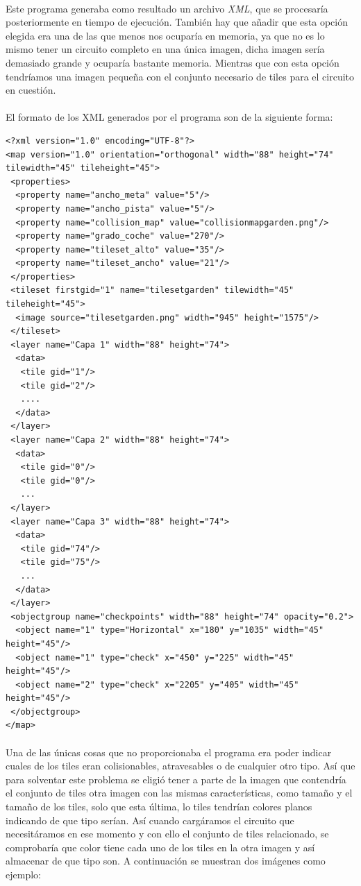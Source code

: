 \paragraph{}
Este programa generaba como resultado un archivo \emph{XML}, que se procesaría posteriormente en tiempo de ejecución. También hay
que añadir que esta opción elegida era una de las que menos nos ocuparía en memoria, ya que no es lo mismo tener un circuito 
completo en una única imagen, dicha imagen sería demasiado grande y ocuparía bastante memoria. Mientras
que con esta opción tendríamos una imagen pequeña con el conjunto necesario de tiles para el circuito en cuestión.

\paragraph{}
El formato de los XML generados por el programa son de la siguiente forma:

\begin{lstlisting}[style=XML]
<?xml version="1.0" encoding="UTF-8"?>
<map version="1.0" orientation="orthogonal" width="88" height="74" tilewidth="45" tileheight="45">
 <properties>
  <property name="ancho_meta" value="5"/>
  <property name="ancho_pista" value="5"/>
  <property name="collision_map" value="collisionmapgarden.png"/>
  <property name="grado_coche" value="270"/>
  <property name="tileset_alto" value="35"/>
  <property name="tileset_ancho" value="21"/>
 </properties>
 <tileset firstgid="1" name="tilesetgarden" tilewidth="45" tileheight="45">
  <image source="tilesetgarden.png" width="945" height="1575"/>
 </tileset>
 <layer name="Capa 1" width="88" height="74">
  <data>   
   <tile gid="1"/>
   <tile gid="2"/>
   ....
  </data>   
 </layer>
 <layer name="Capa 2" width="88" height="74">
  <data>
   <tile gid="0"/>
   <tile gid="0"/>
   ...
 </layer>
 <layer name="Capa 3" width="88" height="74">
  <data>
   <tile gid="74"/>
   <tile gid="75"/>
   ...
  </data>
 </layer>
 <objectgroup name="checkpoints" width="88" height="74" opacity="0.2">
  <object name="1" type="Horizontal" x="180" y="1035" width="45" height="45"/>
  <object name="1" type="check" x="450" y="225" width="45" height="45"/>
  <object name="2" type="check" x="2205" y="405" width="45" height="45"/>
 </objectgroup>
</map>
\end{lstlisting}

\paragraph{}
Una de las únicas cosas que no proporcionaba el programa era poder indicar cuales de los tiles eran colisionables, atravesables o
de cualquier otro tipo. Así que para solventar este problema se eligió tener a parte de la imagen que contendría el conjunto de 
tiles otra imagen con las mismas características, como tamaño y el tamaño de los tiles, solo que esta última, lo tiles tendrían 
colores planos indicando de que tipo serían. Así cuando cargáramos el circuito
que necesitáramos en ese momento y con ello
el conjunto de tiles relacionado, se comprobaría que color tiene cada uno de los tiles en la otra imagen y así almacenar
de que tipo son. A continuación se muestran dos imágenes como ejemplo:

